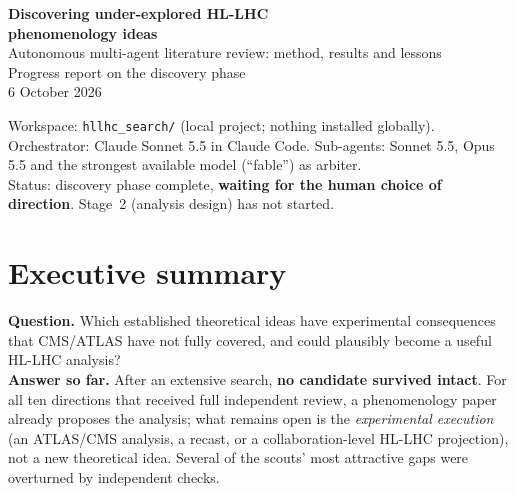 \documentclass[11pt,a4paper]{article}
\begin{document}
\begin{titlepage}
\centering\vspace*{2.5cm}
{\Huge\bfseries\color{acc} Discovering under-explored HL-LHC\\[4pt] phenomenology ideas}\\[1.2cm]
{\Large Autonomous multi-agent literature review: method, results and lessons}\\[1.5cm]
{\large Progress report on the discovery phase}\\[0.6cm]
{\large 6 October 2026}\\[2cm]
\begin{minipage}{0.8\textwidth}\small
Workspace: \texttt{hllhc\_search/} (local project; nothing installed globally).\\
Orchestrator: Claude Sonnet 5.5 in Claude Code. Sub-agents: Sonnet 5.5, Opus 5.5 and the strongest available model (``fable'') as arbiter.\\
Status: discovery phase complete, \textbf{waiting for the human choice of direction}. Stage~2 (analysis design) has not started.
\end{minipage}
\vfill
\end{titlepage}
\tableofcontents\newpage

\section{Executive summary}
\begin{key}
\textbf{Question.} Which established theoretical ideas have experimental consequences that CMS/ATLAS have not fully covered, and could plausibly become a useful HL-LHC analysis?\\[3pt]
\textbf{Answer so far.} After an extensive search, \textbf{no candidate survived intact}. For all ten directions that received full independent review, a phenomenology paper already proposes the analysis; what remains open is the \emph{experimental execution} (an ATLAS/CMS analysis, a recast, or a collaboration-level HL-LHC projection), not a new theoretical idea. Several of the scouts' most attractive gaps were overturned by independent checks.
\end{key}
\end{document}
